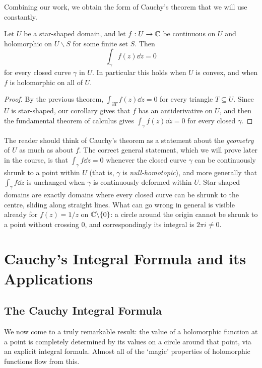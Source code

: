 \documentclass[a4paper]{scrartcl}
\begin{document}
Combining our work, we obtain the form of Cauchy's theorem that we will use constantly.

\begin{theorem}
    Let $U$ be a star-shaped domain, and let $f: U \rightarrow \mathbb{C}$ be continuous on $U$ and holomorphic on $U \backslash S$ for some finite set $S$. Then
    $$
    \int_\gamma f(z) \dd z = 0
    $$
    for every closed curve $\gamma$ in $U$. In particular this holds when $U$ is convex, and when $f$ is holomorphic on all of $U$.
\end{theorem}
\begin{proof}
    By the previous theorem, $\int_{\partial T} f(z) \dd z = 0$ for every triangle $T \subseteq U$. Since $U$ is star-shaped, our corollary gives that $f$ has an antiderivative on $U$, and then the fundamental theorem of calculus gives $\int_\gamma f(z) \dd z = 0$ for every closed $\gamma$.
\end{proof}

\begin{remark}
    The reader should think of Cauchy's theorem as a statement about the \emph{geometry} of $U$ as much as about $f$. The correct general statement, which we will prove later in the course, is that $\int_\gamma f \dd z = 0$ whenever the closed curve $\gamma$ can be continuously shrunk to a point within $U$ (that is, $\gamma$ is \emph{null-homotopic}), and more generally that $\int_\gamma f \dd z$ is unchanged when $\gamma$ is continuously deformed within $U$. Star-shaped domains are exactly domains where every closed curve can be shrunk to the centre, sliding along straight lines. What can go wrong in general is visible already for $f(z) = 1/z$ on $\mathbb{C}\backslash\{0\}$: a circle around the origin cannot be shrunk to a point without crossing $0$, and correspondingly its integral is $2\pi i \neq 0$.
\end{remark}

\section{Cauchy's Integral Formula and its Applications}

\subsection{The Cauchy Integral Formula}

We now come to a truly remarkable result: the value of a holomorphic function at a point is completely determined by its values on a circle around that point, via an explicit integral formula. Almost all of the `magic' properties of holomorphic functions flow from this.
\end{document}
